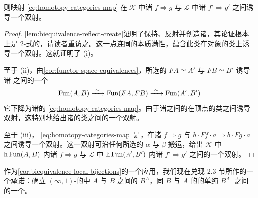 \begin{corollary}
\begin{enumerate}[label=(\roman*)]
\begin{center}
  \end{center}
  则映射 \eqref{eq:homotopy-categories-map} 在 $\mathcal{K}$ 中诸%
  \trNaturalTransformation{} $f\Rightarrow g$ 与 $\mathcal{L}$ 中诸%
  \trNaturalTransformation{} $f'\Rightarrow g'$ 之间诱导一个双射。
\end{enumerate}
\end{corollary}

\begin{proof}
\cref{lem:biequivalence-reflect-create}证明了\trCosmologicalBiequivalence{}保持、反射并创造诸\trEquivalence，其论证根本上是 2-\trCategory{}式的，请读者重访之。这一点连同\trCosmologicalBiequivalence{}的本质满性，蕴含此类\trFunctor{}在对象的\trEquivalence{}类上诱导一个双射。这就证明了 (i)。

至于 (ii)，由\cref{cor:functor-space-equivalences}，所选的\trEquivalence
$FA\simeq A'$ 与 $FB\simeq B'$ 诱导诸%
\trQuasiCategory{}之间的一个\trEquivalence
\begin{equation*}
\Fun(A,B)\xrightarrow{\ \sim\ }\Fun(FA,FB)\xrightarrow{\ \sim\ }\Fun(A',B')
\end{equation*}
它下降为诸\trHomotopyCategory{}的\trEquivalence{} \eqref{eq:homotopy-categories-map}。由于诸\trQuasiCategory{}之间的\trEquivalence{}在顶点的\trIsomorphism{}类之间诱导双射，这特别地给出诸\trFunctor{}的\trIsomorphism{}类之间的一个双射。

至于 (iii)，\trEquivalence{} \eqref{eq:homotopy-categories-map} 是\trFullyFaithful，在诸\trNaturalTransformation{} $f\Rightarrow g$ 与
$b\cdot Ff\cdot a\Rightarrow b\cdot Fg\cdot a$ 之间诱导一个双射。这一双射可沿任何所选的\trIsomorphism{} $\alpha$ 与 $\beta$ 搬运，给出 $\mathcal{K}$ 中 $\mathrm{h}\operatorname{Fun}(A,B)$ 内诸\trNaturalTransformation{} $f\Rightarrow g$ 与 $\mathcal{L}$ 中 $\mathrm{h}\operatorname{Fun}(A',B')$ 内诸\trNaturalTransformation{} $f'\Rightarrow g'$ 之间的一个双射。
\end{proof}

作为\cref{cor:biequivalence-local-bijections}的一个应用，我们现在兑现 2.3 节所作的一个承诺：确立 $(\infty,1)$-\trCategory{}的\trInfinityCosmos{}中%
\trInfinityCategory{} $A$ 与 $B$ 之间的\trInternalHom{} $B^{A}$，同 $B$ 与 $A$ 的\trUnderlyingQuasiCategory{}的单纯\trCotensor{} $B^{A_{0}}$ 之间的一个\trEquivalence。

